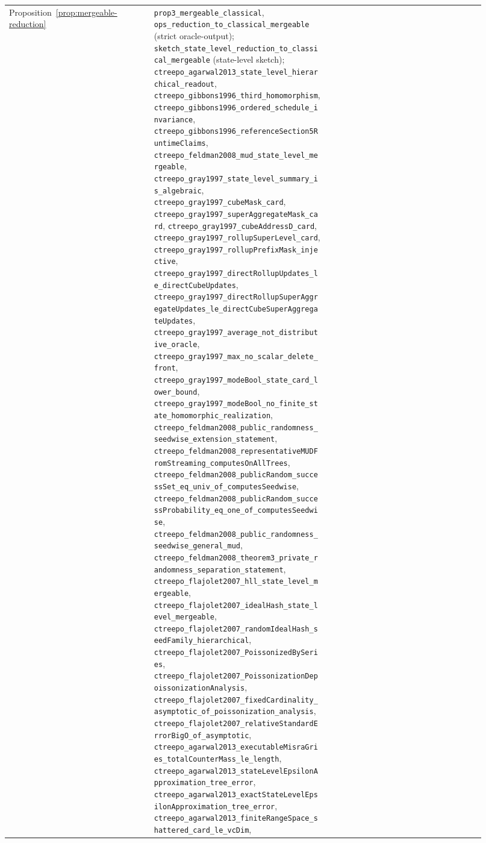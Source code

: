 \begin{table}[h]
\begin{tabular}{p{0.28\linewidth}p{0.34\linewidth}p{0.30\linewidth}}
Proposition~\ref{prop:mergeable-reduction} &
\texttt{prop3\_mergeable\_classical}, \texttt{ops\_reduction\_to\_classical\_mergeable} (strict oracle-output);
\texttt{sketch\_state\_level\_reduction\_to\_classical\_mergeable} (state-level sketch);
\texttt{ctreepo\_agarwal2013\_state\_level\_hierarchical\_readout},
\texttt{ctreepo\_gibbons1996\_third\_homomorphism},
\texttt{ctreepo\_gibbons1996\_ordered\_schedule\_invariance},
\nolinkurl{ctreepo_gibbons1996_referenceSection5RuntimeClaims},
\texttt{ctreepo\_feldman2008\_mud\_state\_level\_mergeable},
\texttt{ctreepo\_gray1997\_state\_level\_summary\_is\_algebraic},
\texttt{ctreepo\_gray1997\_cubeMask\_card},
\texttt{ctreepo\_gray1997\_superAggregateMask\_card},
\texttt{ctreepo\_gray1997\_cubeAddressD\_card},
\texttt{ctreepo\_gray1997\_rollupSuperLevel\_card},
\texttt{ctreepo\_gray1997\_rollupPrefixMask\_injective},
\nolinkurl{ctreepo_gray1997_directRollupUpdates_le_directCubeUpdates},
\nolinkurl{ctreepo_gray1997_directRollupSuperAggregateUpdates_le_directCubeSuperAggregateUpdates},
\texttt{ctreepo\_gray1997\_average\_not\_distributive\_oracle},
\texttt{ctreepo\_gray1997\_max\_no\_scalar\_delete\_front},
\nolinkurl{ctreepo_gray1997_modeBool_state_card_lower_bound},
\nolinkurl{ctreepo_gray1997_modeBool_no_finite_state_homomorphic_realization},
\texttt{ctreepo\_feldman2008\_public\_randomness\_seedwise\_extension\_statement},
\nolinkurl{ctreepo_feldman2008_representativeMUDFromStreaming_computesOnAllTrees},
\nolinkurl{ctreepo_feldman2008_publicRandom_successSet_eq_univ_of_computesSeedwise},
\nolinkurl{ctreepo_feldman2008_publicRandom_successProbability_eq_one_of_computesSeedwise},
\nolinkurl{ctreepo_feldman2008_public_randomness_seedwise_general_mud},
\texttt{ctreepo\_feldman2008\_theorem3\_private\_randomness\_separation\_statement},
\texttt{ctreepo\_flajolet2007\_hll\_state\_level\_mergeable},
\texttt{ctreepo\_flajolet2007\_idealHash\_state\_level\_mergeable},
\nolinkurl{ctreepo_flajolet2007_randomIdealHash_seedFamily_hierarchical},
\nolinkurl{ctreepo_flajolet2007_PoissonizedBySeries},
\nolinkurl{ctreepo_flajolet2007_PoissonizationDepoissonizationAnalysis},
\nolinkurl{ctreepo_flajolet2007_fixedCardinality_asymptotic_of_poissonization_analysis},
\texttt{ctreepo\_flajolet2007\_relativeStandardErrorBigO\_of\_asymptotic},
\nolinkurl{ctreepo_agarwal2013_executableMisraGries_totalCounterMass_le_length},
\nolinkurl{ctreepo_agarwal2013_stateLevelEpsilonApproximation_tree_error},
\nolinkurl{ctreepo_agarwal2013_exactStateLevelEpsilonApproximation_tree_error},
\nolinkurl{ctreepo_agarwal2013_finiteRangeSpace_shattered_card_le_vcDim},

\end{tabular}
\end{table}
